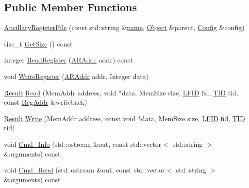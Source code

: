 \subsection*{Public Member Functions}
\begin{DoxyCompactItemize}
\item 
\hyperlink{class_simulator_1_1drisc_1_1_ancillary_register_file_afde874ec5ddcb79b5a5f3176b992cddb}{Ancillary\+Register\+File} (const std\+::string \&\hyperlink{mtconf_8c_a8f8f80d37794cde9472343e4487ba3eb}{name}, \hyperlink{class_simulator_1_1_object}{Object} \&parent, \hyperlink{class_config}{Config} \&config)
\item 
size\+\_\+t \hyperlink{class_simulator_1_1drisc_1_1_ancillary_register_file_a0ac3171f2a7eab754224d745d512187f}{Get\+Size} () const 
\item 
Integer \hyperlink{class_simulator_1_1drisc_1_1_ancillary_register_file_a75607efb134538da4dea7feb2d5caa03}{Read\+Register} (\hyperlink{namespace_simulator_1_1drisc_ad67fa6022bb8dfc914132e37bbba2e97}{A\+R\+Addr} addr) const 
\item 
void \hyperlink{class_simulator_1_1drisc_1_1_ancillary_register_file_a561e7817b28287f2900d209b474aa938}{Write\+Register} (\hyperlink{namespace_simulator_1_1drisc_ad67fa6022bb8dfc914132e37bbba2e97}{A\+R\+Addr} addr, Integer data)
\item 
\hyperlink{namespace_simulator_a4b6b5616e7236c0c131516a441776805}{Result} \hyperlink{class_simulator_1_1drisc_1_1_ancillary_register_file_ad56a4d08a6faf73d117cfe2767e5e9e2}{Read} (Mem\+Addr address, void $\ast$data, Mem\+Size size, \hyperlink{namespace_simulator_aaccbc706b2d6c99085f52f6dfc2333e4}{L\+F\+I\+D} fid, \hyperlink{namespace_simulator_a483cc4ecee1736e895054617672cded5}{T\+I\+D} tid, const \hyperlink{struct_simulator_1_1_reg_addr}{Reg\+Addr} \&writeback)
\item 
\hyperlink{namespace_simulator_a4b6b5616e7236c0c131516a441776805}{Result} \hyperlink{class_simulator_1_1drisc_1_1_ancillary_register_file_a18868afcd222db4d23133218919bf822}{Write} (Mem\+Addr address, const void $\ast$data, Mem\+Size size, \hyperlink{namespace_simulator_aaccbc706b2d6c99085f52f6dfc2333e4}{L\+F\+I\+D} fid, \hyperlink{namespace_simulator_a483cc4ecee1736e895054617672cded5}{T\+I\+D} tid)
\item 
void \hyperlink{class_simulator_1_1drisc_1_1_ancillary_register_file_aa2e8ca48224cb01a0c0b33f9f6f7aa31}{Cmd\+\_\+\+Info} (std\+::ostream \&out, const std\+::vector$<$ std\+::string $>$ \&arguments) const 
\item 
void \hyperlink{class_simulator_1_1drisc_1_1_ancillary_register_file_a02d850eea146d21dda48e7d384357022}{Cmd\+\_\+\+Read} (std\+::ostream \&out, const std\+::vector$<$ std\+::string $>$ \&arguments) const 
\end{DoxyCompactItemize}


